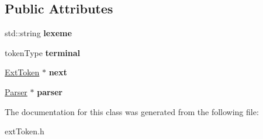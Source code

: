 \subsection*{Public Attributes}
\begin{DoxyCompactItemize}
\item 
\hypertarget{classExtToken_a5af1643a542ef7ee8ca0f82706383ae3}{std\-::string {\bfseries lexeme}}\label{classExtToken_a5af1643a542ef7ee8ca0f82706383ae3}

\item 
\hypertarget{classExtToken_abbdaef42b65403cdc0247839ef95c875}{token\-Type {\bfseries terminal}}\label{classExtToken_abbdaef42b65403cdc0247839ef95c875}

\item 
\hypertarget{classExtToken_aa02995a897183b2a6ef758e541534e46}{\hyperlink{classExtToken}{Ext\-Token} $\ast$ {\bfseries next}}\label{classExtToken_aa02995a897183b2a6ef758e541534e46}

\item 
\hypertarget{classExtToken_af70d22156d5f8e855a8b0d92a82706ba}{\hyperlink{classParser}{Parser} $\ast$ {\bfseries parser}}\label{classExtToken_af70d22156d5f8e855a8b0d92a82706ba}

\end{DoxyCompactItemize}


The documentation for this class was generated from the following file\-:\begin{DoxyCompactItemize}
\item 
ext\-Token.\-h\end{DoxyCompactItemize}
